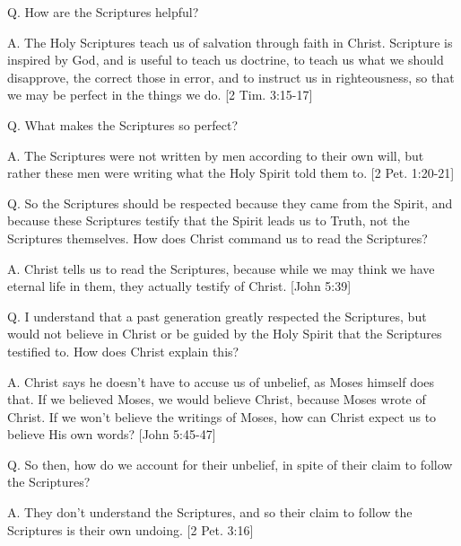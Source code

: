 \documentclass[../main.tex]{subfiles}
\begin{document}
	Q. How are the Scriptures helpful?
	
	A. The Holy Scriptures teach us of salvation through faith in Christ. Scripture is inspired by God, and is useful to teach us doctrine, to teach us what we should disapprove, the correct those in error, and to instruct us in righteousness, so that we may be perfect in the things we do. [2 Tim. 3:15-17]
	
	Q. What makes the Scriptures so perfect?
	
	A. The Scriptures were not written by men according to their own will, but rather these men were writing what the Holy Spirit told them to. [2 Pet. 1:20-21]
	
	Q. So the Scriptures should be respected because they came from the Spirit, and because these Scriptures testify that the Spirit leads us to Truth, not the Scriptures themselves. How does Christ command us to read the Scriptures?
	
	A. Christ tells us to read the Scriptures, because while we may think we have eternal life in them, they actually testify of Christ. [John 5:39]
	
	Q. I understand that a past generation greatly respected the Scriptures, but would not believe in Christ or be guided by the Holy Spirit that the Scriptures testified to. How does Christ explain this?
	
	A. Christ says he doesn't have to accuse us of unbelief, as Moses himself does that. If we believed Moses, we would believe Christ, because Moses wrote of Christ. If we won't believe the writings of Moses, how can Christ expect us to believe His own words? [John 5:45-47]
	
	Q. So then, how do we account for their unbelief, in spite of their claim to follow the Scriptures?
	
	A. They don't understand the Scriptures, and so their claim to follow the Scriptures is their own undoing. [2 Pet. 3:16]
	
\end{document}
